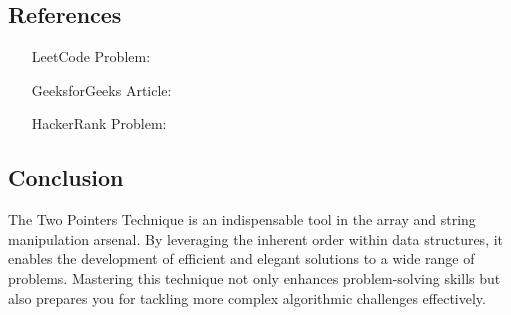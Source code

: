 \subsection*{References}
\begin{itemize}
    \item [LeetCode Problem:] 
    \item [GeeksforGeeks Article:] 
    \item [HackerRank Problem:] 
\end{itemize}

\subsection*{Conclusion}
The Two Pointers Technique is an indispensable tool in the array and string manipulation arsenal. By leveraging the inherent order within data structures, it enables the development of efficient and elegant solutions to a wide range of problems. Mastering this technique not only enhances problem-solving skills but also prepares you for tackling more complex algorithmic challenges effectively.